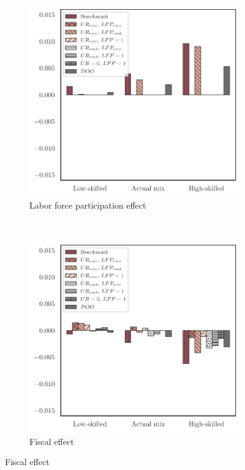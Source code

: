 \documentclass[a4paper,12pt]{article}
\begin{document}
{\begin{landscape}
\begin{center}
\begin{figure}[htb!]
\begin{subfigure}{.3\linewidth}
\end{subfigure}
\hfill
\begin{subfigure}{.3\linewidth}
  \centering
  \caption{Labor force participation effect} \label{fig:decomp_mean_lnINC}
  \includegraphics[width=\linewidth]{graphs/qlnINC.pdf}
\end{subfigure}
\\[0.5cm]
\begin{subfigure}{.3\linewidth}
  \centering
  \caption{Fiscal effect} \label{fig:decomp_mean_tauINC}
  \includegraphics[width=\linewidth]{graphs/qTauINC.pdf}

\end{subfigure}
\end{figure}
\end{center}
\end{landscape}}
\end{document}
